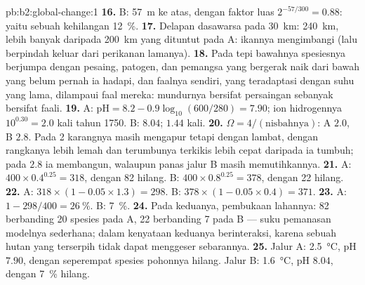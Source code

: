 \begin{solution}{pb:b2:global-change:1}
\textbf{16.} B: \qty{57}{m} ke atas, dengan faktor luas $2^{-57/300} = 0.88$: yaitu sebuah kehilangan \qty{12}{\%}.
\textbf{17.} Delapan dasawarsa pada \qty{30}{km}: \qty{240}{km}, lebih
banyak daripada \qty{200}{km} yang dituntut pada A: ikannya
mengimbangi (lalu berpindah keluar dari perikanan lamanya).
\textbf{18.} Pada tepi bawahnya spesiesnya berjumpa dengan pesaing,
patogen, dan pemangsa yang bergerak naik dari bawah yang belum pernah
ia hadapi, dan faalnya sendiri, yang teradaptasi dengan suhu yang lama,
dilampaui faal mereka: mundurnya bersifat persaingan sebanyak
bersifat faali.
\textbf{19.} A: $\mathrm{pH} = 8.2 - 0.9\log_{10}(600/280) = 7.90$;
ion hidrogennya $10^{0.30} = 2.0$ kali tahun 1750. B: $8.04$; $1.44$
kali.
\textbf{20.} $\Omega = 4/(\text{nisbahnya})$: A $2.0$, B $2.8$. Pada 2
karangnya masih mengapur tetapi dengan lambat, dengan rangkanya lebih
lemah dan terumbunya terkikis lebih cepat daripada ia tumbuh; pada
$2.8$ ia membangun, walaupun panas jalur B masih memutihkannya.
\textbf{21.} A: $400\times 0.4^{0.25} = 318$, dengan 82 hilang. B:
$400\times 0.8^{0.25} = 378$, dengan 22 hilang.
\textbf{22.} A: $318\times(1 - 0.05\times 1.3) = 298$. B:
$378\times(1 - 0.05\times 0.4) = 371$.
\textbf{23.} A: $1 - 298/400 = \qty{26}{\%}$. B: \qty{7}{\%}.
\textbf{24.} Pada keduanya, pembukaan lahannya: 82 berbanding 20
spesies pada A, 22 berbanding 7 pada B --- suku pemanasan modelnya
sederhana; dalam kenyataan keduanya berinteraksi, karena sebuah hutan
yang terserpih tidak dapat menggeser sebarannya.
\textbf{25.} Jalur A: \qty{2.5}{\celsius}, pH $7.90$, dengan seperempat
spesies pohonnya hilang. Jalur B: \qty{1.6}{\celsius}, pH $8.04$,
dengan \qty{7}{\%} hilang.
\end{solution}
